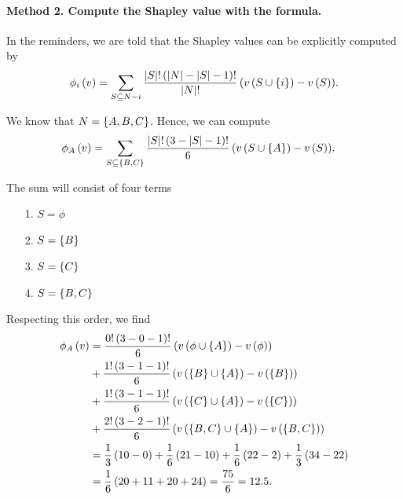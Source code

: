 \begin{enumerate} [label=\alph*.]
	
	\paragraph{Method 2. Compute the Shapley value with the formula.}
	
	In the reminders, we are told that the Shapley values can be explicitly computed by
	\begin{align*}
		\phi_{i} \left(v\right) = \sum_{S \subseteq N -i}{\dfrac{\left\lvert S\right\rvert! \left(\left\lvert N\right\rvert - \left\lvert S\right\rvert - 1\right)!}{\left\lvert N\right\rvert!} \left(v \left(S \cup \left\{i\right\}\right) - v \left(S\right)\right)}.
	\end{align*}
	
	We know that $N = \left\{A, B, C\right\}$. Hence, we can compute
	\begin{align*}
	    \phi_{A} \left(v\right)
	    &= \sum_{S \subseteq \left\{B, C\right\}}{\dfrac{\left\lvert S\right\rvert! \left(3 - \left\lvert S\right\rvert - 1\right)!}{6} \left(v \left(S \cup \left\{A\right\}\right) - v \left(S\right)\right)}.
	\end{align*}
	
	The sum will consist of four terms
	\begin{enumerate}
	    \item[1.] $S = \phi$
	    \item[2.] $S = \left\{B\right\}$
	    \item[3.] $S = \left\{C\right\}$
	    \item[4.] $S = \left\{B, C\right\}$
	\end{enumerate}
	
	Respecting this order, we find
	\begin{align*}
	    \phi_{A} \left(v\right)
	    &= \dfrac{0! \left(3 - 0 - 1\right)!}{6} \left(v \left(\phi \cup \left\{A\right\}\right) - v \left(\phi\right)\right) \\
	    &+ \dfrac{1! \left(3 - 1 - 1\right)!}{6} \left(v \left(\left\{B\right\} \cup \left\{A\right\}\right) - v \left(\left\{B\right\}\right)\right) \\
	    &+ \dfrac{1! \left(3 - 1 - 1\right)!}{6} \left(v \left(\left\{C\right\} \cup \left\{A\right\}\right) - v \left(\left\{C\right\}\right)\right) \\
	    &+ \dfrac{2! \left(3 - 2 - 1\right)!}{6} \left(v \left(\left\{B, C\right\} \cup \left\{A\right\}\right) - v \left(\left\{B, C\right\}\right)\right) \\
	    &= \dfrac{1}{3} \left(10 - 0\right)
	    + \dfrac{1}{6} \left(21 - 10\right)
	    + \dfrac{1}{6} \left(22 - 2\right)
	    + \dfrac{1}{3} \left(34 - 22\right) \\
	    &= \dfrac{1}{6} \left(20 + 11 + 20 + 24\right)
	    = \dfrac{75}{6}
	    = 12.5.
	\end{align*}
	

\end{enumerate}
